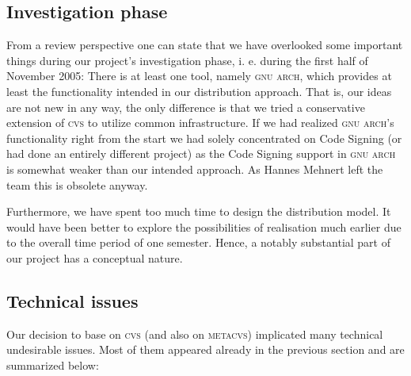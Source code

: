 \documentclass[fleqn, 10pt, a4paper]{report} \usepackage{amssymb}
\begin{document}
\subsection{Investigation phase}

From a review perspective one can state that we have overlooked some
important things during our project's investigation phase, i. e.
during the first half of November 2005: There is at least one tool,
namely \textsc{gnu arch}, which provides at least the functionality
intended in our distribution approach. That is, our ideas are
not new in any way, the only difference is that we tried a conservative
extension of \textsc{cvs} to utilize common infrastructure.
If we had realized \textsc{gnu arch}'s functionality right from the
start we had solely concentrated on Code Signing (or had done an
entirely different project) as the Code Signing support in \textsc{gnu arch}
is somewhat weaker than our intended approach. As Hannes Mehnert
left the team this is obsolete anyway.

Furthermore, we have spent too much time to design the distribution model.
It would have been better to explore the possibilities of realisation
much earlier due to the overall time period of one semester. Hence,
a notably substantial part of our project has a conceptual nature.

\subsection{Technical issues}

Our decision to base on \textsc{cvs} (and also on \textsc{metacvs})
implicated many technical
undesirable issues. Most of them appeared already in the previous
section and are summarized below:
\end{document}
